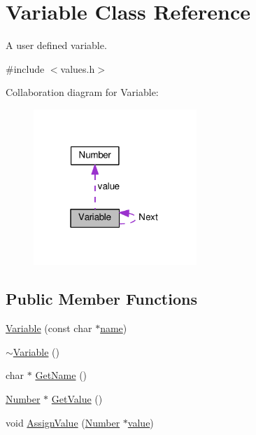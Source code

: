 \hypertarget{classVariable}{}\section{Variable Class Reference}
\label{classVariable}


A user defined variable.  




{\ttfamily \#include $<$values.\+h$>$}



Collaboration diagram for Variable\+:\nopagebreak
\begin{figure}[H]
\begin{center}
\leavevmode
\includegraphics[width=175pt]{classVariable__coll__graph}
\end{center}
\end{figure}
\subsection*{Public Member Functions}
\begin{DoxyCompactItemize}
\item 
\hyperlink{classVariable_a230014211eb4309bcec965df5799a7eb}{Variable} (const char $\ast$\hyperlink{classVariable_a821b09d0920ea8685fc2e4c804106416}{name})
\item 
\hyperlink{classVariable_acfc14d0ad77af53025f890b4d3a7745a}{$\sim$\+Variable} ()
\item 
char $\ast$ \hyperlink{classVariable_accf221d35cec8a9707e84891b715fb6c}{Get\+Name} ()
\item 
\hyperlink{structNumber}{Number} $\ast$ \hyperlink{classVariable_adb77b2681374245b5d606a1d149d0d91}{Get\+Value} ()
\item 
void \hyperlink{classVariable_ad8c997ea0edab8bf72ada85963800211}{Assign\+Value} (\hyperlink{structNumber}{Number} $\ast$\hyperlink{classVariable_a97f7747dc30797f29b247e26ca585c94}{value})
\end{DoxyCompactItemize}
